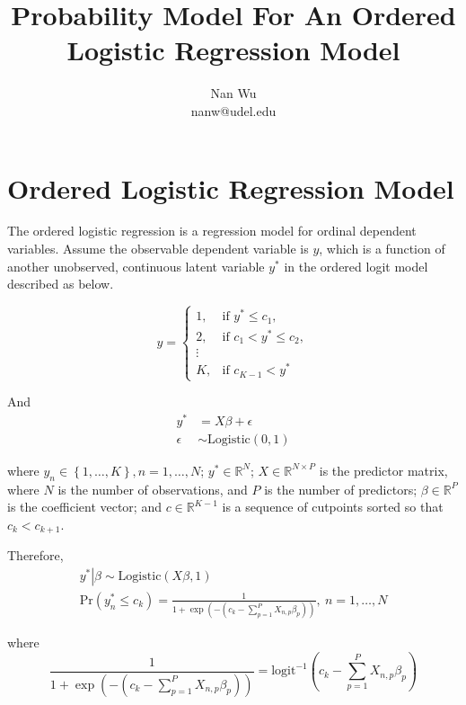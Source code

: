 \documentclass[12pt]{article}
\def\eqa{\left(c_k - \sum \limits_{p=1}^P X_{n,p}\beta_p \right)}
\begin{document}
\title{Probability Model For An Ordered Logistic Regression Model}
\author{Nan Wu \\ nanw@udel.edu}
\date{}
\maketitle

\section{Ordered Logistic Regression Model}

The ordered logistic regression is a regression model for ordinal dependent variables. Assume the observable dependent variable is $y$, which is a function of another unobserved, continuous latent variable $y^*$ in the ordered logit model described as below.

\begin{equation*}
  y= \begin{cases}
    1, & \text{if $y^* \leq c_1$},\\
    2, & \text{if $c_1 < y^* \leq c_2$},\\
    \vdots \\
    K, & \text{if $c_{K-1} < y^*$}
  \end{cases}
\end{equation*}

And
\begin{align*}
  y^* &= X\beta + \epsilon \\
  \epsilon &\sim \mathrm{Logistic}\left(0,1\right)
\end{align*}

where $y_n \in \left \{1,\ldots, K\right \}, n=1,\ldots,N$; $y^* \in \mathbb{R}^N$; $X\in \mathbb{R}^{N \times P}$ is the predictor matrix, where $N$ is the number of observations, and $P$ is the number of predictors; $\beta \in \mathbb{R}^P$ is the coefficient vector; and $c \in \mathbb{R}^{K-1}$  is a sequence of cutpoints sorted so that $c_k<c_{k+1}$.

Therefore,
\begin{gather*}
  \left. y^* \right|\beta \sim \mathrm{Logistic}\left(X\beta, 1\right)\\
  \mathrm{Pr}\left(y^*_n \leq c_k\right)=\frac{1}{1+\exp \left(-\eqa \right)}, \ n=1,\ldots,N
\end{gather*}

where
\begin{equation}
  \frac{1}{1+\exp \left(- \eqa \right)}= \mathrm{logit}^{-1}\eqa
\end{equation}
\end{document}
